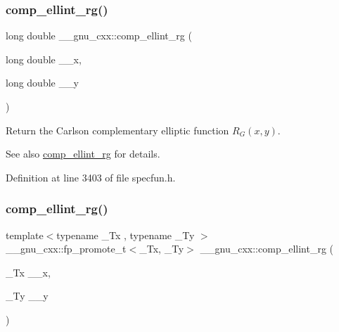 \subsubsection{\texorpdfstring{comp\+\_\+ellint\+\_\+rg()}{comp\_ellint\_rg()}\hspace{0.1cm}{\footnotesize\ttfamily [2/3]}}
{\footnotesize\ttfamily long double \+\_\+\+\_\+gnu\+\_\+cxx\+::comp\+\_\+ellint\+\_\+rg (\begin{DoxyParamCaption}\item[{long double}]{\+\_\+\+\_\+x,  }\item[{long double}]{\+\_\+\+\_\+y }\end{DoxyParamCaption})\hspace{0.3cm}{\ttfamily [inline]}}

Return the Carlson complementary elliptic function $ R_G(x,y) $.

\begin{DoxySeeAlso}{See also}
\hyperlink{group__gnu__math__spec__func_ga978f8eec6e5edc918b243925dbacb65b}{comp\+\_\+ellint\+\_\+rg} for details. 
\end{DoxySeeAlso}


Definition at line 3403 of file specfun.\+h.

\mbox{\label{group__gnu__math__spec__func_ga389b1ef6cad1e33c1120665a4b915642}} 
\subsubsection{\texorpdfstring{comp\+\_\+ellint\+\_\+rg()}{comp\_ellint\_rg()}\hspace{0.1cm}{\footnotesize\ttfamily [3/3]}}
{\footnotesize\ttfamily template$<$typename \+\_\+\+Tx , typename \+\_\+\+Ty $>$ \\
\+\_\+\+\_\+gnu\+\_\+cxx\+::fp\+\_\+promote\+\_\+t$<$\+\_\+\+Tx, \+\_\+\+Ty$>$ \+\_\+\+\_\+gnu\+\_\+cxx\+::comp\+\_\+ellint\+\_\+rg (\begin{DoxyParamCaption}\item[{\+\_\+\+Tx}]{\+\_\+\+\_\+x,  }\item[{\+\_\+\+Ty}]{\+\_\+\+\_\+y }\end{DoxyParamCaption})\hspace{0.3cm}{\ttfamily [inline]}}

